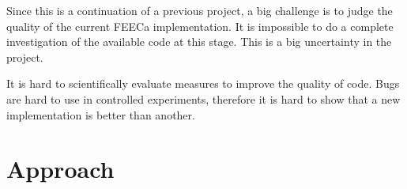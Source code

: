 \documentclass{scrartcl}
\begin{document}
Since this is a continuation of a previous project, a big challenge is to judge the quality
of the current FEECa implementation.
It is impossible to do a complete investigation of the available code at this stage.
This is a big uncertainty in the project.

It is hard to scientifically evaluate measures to improve the quality of code.
Bugs are hard to use in controlled experiments, therefore it is hard to show
that a new implementation is better than another.



\section{Approach}




\end{document}
